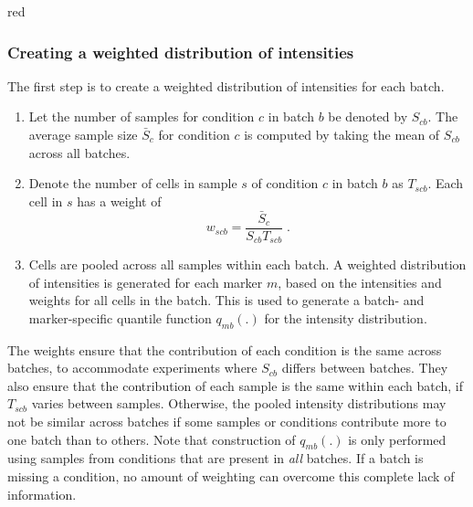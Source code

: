 \documentclass{article}
\begin{document}
\begin{color}{red}
\subsubsection{Creating a weighted distribution of intensities}
The first step is to create a weighted distribution of intensities for each batch.
\begin{enumerate}
    \item Let the number of samples for condition $c$ in batch $b$ be denoted by $S_{cb}$.
        The average sample size $\bar{S}_c$ for condition $c$ is computed by taking the mean of $S_{cb}$ across all batches.
    \item Denote the number of cells in sample $s$ of condition $c$ in batch $b$ as $T_{scb}$.
        Each cell in $s$ has a weight of 
        \[
            w_{scb} = \frac{\bar{S}_c}{S_{cb}T_{scb}} \;.
        \]
    \item Cells are pooled across all samples within each batch.
        A weighted distribution of intensities is generated for each marker $m$, based on the intensities and weights for all cells in the batch.
        This is used to generate a batch- and marker-specific quantile function $q_{mb}(.)$ for the intensity distribution.
\end{enumerate}
The weights ensure that the contribution of each condition is the same across batches, to accommodate experiments where $S_{cb}$ differs between batches.
They also ensure that the contribution of each sample is the same within each batch, if $T_{scb}$ varies between samples.
Otherwise, the pooled intensity distributions may not be similar across batches if some samples or conditions contribute more to one batch than to others.
Note that construction of $q_{mb}(.)$ is only performed using samples from conditions that are present in \textit{all} batches.
If a batch is missing a condition, no amount of weighting can overcome this complete lack of information.


\end{color}
\end{document}
